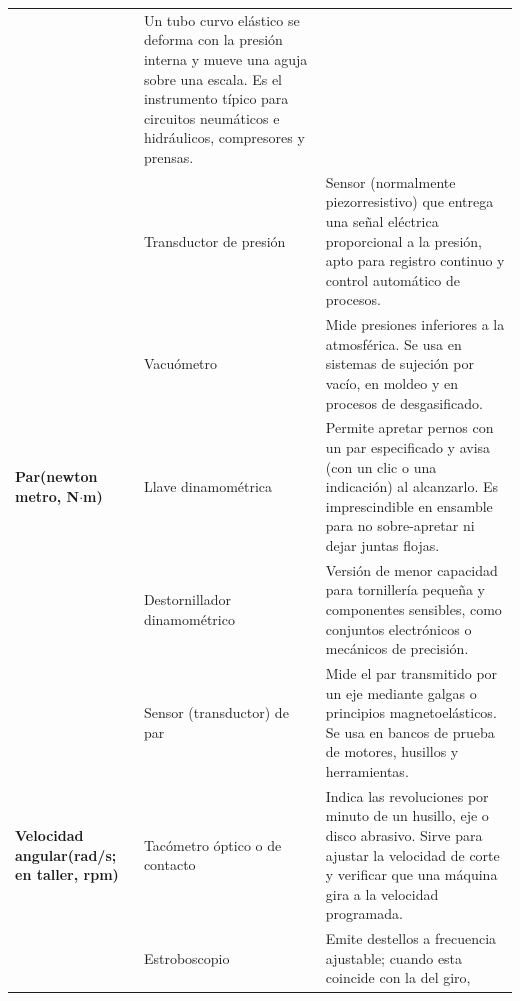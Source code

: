 \documentclass[12pt,a4paper]{article}
\begin{document}
{\begin{longtable}{>{\raggedright\arraybackslash\bfseries}p{2.45cm}
				>{\raggedright\arraybackslash}p{3.3cm}
				>{\raggedright\arraybackslash}p{8.4cm}}
			                                                 & Un tubo curvo elástico
			se deforma con la presión interna y mueve una aguja
			sobre una escala. Es el instrumento típico para circuitos neumáticos e
			hidráulicos, compresores y prensas.
			\\
			                                                 & Transductor de presión
			                                                 & Sensor (normalmente
			piezorresistivo) que entrega una
			señal eléctrica proporcional a la presión, apto para registro continuo y
			control
			automático de procesos.
			\\
			                                                 & Vacuómetro
			                                                 & Mide presiones
			inferiores a la atmosférica. Se usa en sistemas
			de sujeción por vacío, en moldeo y en procesos de desgasificado.
			\\
			\rowcolor{lightblue}
			Par\newline(newton metro, N$\cdot$m)             & Llave dinamométrica
			                                                 & Permite apretar
			pernos con un par especificado y avisa (con un clic o una indicación) al
			alcanzarlo. Es imprescindible en ensamble para no sobre-apretar ni dejar
			juntas
			flojas.
			\\
			\rowcolor{lightblue}
			                                                 & Destornillador
			dinamométrico                                    & Versión de menor
			capacidad para
			tornillería pequeña y componentes sensibles, como conjuntos electrónicos o
			mecánicos de precisión.
			\\
			\rowcolor{lightblue}
			                                                 & Sensor (transductor) de
			par                                              & Mide el par transmitido
			por un eje
			mediante galgas o principios magnetoelásticos. Se usa en bancos de prueba
			de
			motores, husillos y herramientas.
			\\
			Velocidad angular\newline(rad/s; en taller, rpm) & Tacómetro óptico o de
			contacto                                         & Indica las revoluciones
			por minuto de un husillo, eje o disco
			abrasivo. Sirve para ajustar la velocidad de corte y verificar que una
			máquina
			gira a la velocidad programada.
			\\
			                                                 & Estroboscopio
			                                                 & Emite destellos a
			frecuencia ajustable; cuando esta coincide con la del giro,

\end{longtable}}
\end{document}
